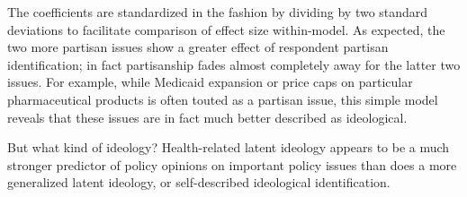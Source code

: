 \documentclass[
  oneside]{book}
\begin{document}
The coefficients are standardized in the \citet{Gelman:2008} fashion by dividing by two standard deviations to facilitate comparison of effect size within-model. As expected, the two more partisan issues show a greater effect of respondent partisan identification; in fact partisanship fades almost completely away for the latter two issues. For example, while Medicaid expansion or price caps on particular pharmaceutical products is often touted as a partisan issue, this simple model reveals that these issues are in fact much better described as ideological.

But what kind of ideology? Health-related latent ideology appears to be a much stronger predictor of policy opinions on important policy issues than does a more generalized latent ideology, or self-described ideological identification.
\end{document}
